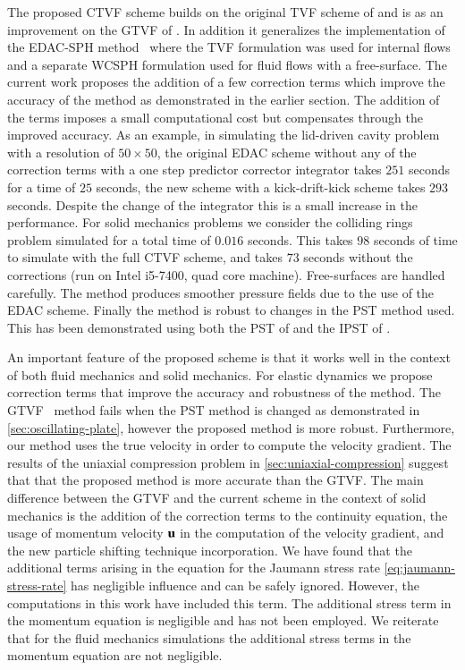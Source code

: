 The proposed CTVF scheme builds on the original TVF scheme of
\cite{Adami2013} and is as an improvement on the GTVF of
\cite{zhang_hu_adams17}. In addition it generalizes the implementation of the
EDAC-SPH method~\citep{edac-sph:cf:2019} where the TVF formulation was used for
internal flows and a separate WCSPH formulation used for fluid flows with a
free-surface. The current work proposes the addition of a few correction terms
which improve the accuracy of the method as demonstrated in the earlier
section. The addition of the terms imposes a small computational cost but
compensates through the improved accuracy. As an example, in simulating the
lid-driven cavity problem with a resolution of $50 \times 50$, the original
EDAC scheme without any of the correction terms with a one step predictor
corrector integrator takes $251$ seconds for a time of $25$ seconds, the new
scheme with a kick-drift-kick scheme takes $293$ seconds. Despite the change
of the integrator this is a small increase in the performance. For solid
mechanics problems we consider the colliding rings problem simulated for a
total time of $0.016$ seconds. This takes $98$ seconds of time to simulate
with the full CTVF scheme, and takes $73$ seconds without the corrections (run
on Intel i5-7400, quad core machine). Free-surfaces are handled carefully.
The method produces smoother pressure fields due to the use of the EDAC
scheme. Finally the method is robust to changes in the PST method used. This
has been demonstrated using both the PST of \cite{sun_consistent_2019} and
the IPST of \cite{huang_kernel_2019}.

An important feature of the proposed scheme is that it works well in the
context of both fluid mechanics and solid mechanics. For elastic dynamics we
propose correction terms that improve the accuracy and robustness of the
method. The GTVF~\citep{zhang_hu_adams17} method fails when the PST method is
changed as demonstrated in \cref{sec:oscillating-plate}, however the proposed
method is more robust. Furthermore, our method uses the true velocity in order
to compute the velocity gradient. The results of the uniaxial compression
problem in \cref{sec:uniaxial-compression} suggest that that the proposed
method is more accurate than the GTVF. The main difference between the GTVF
and the current scheme in the context of solid mechanics is the addition of
the correction terms to the continuity equation, the usage of momentum
velocity $\mathbf{u}$ in the computation of the velocity gradient, and the new
particle shifting technique incorporation. We have found that the additional
terms arising in the equation for the Jaumann stress rate
\cref{eq:jaumann-stress-rate} has negligible influence and can be safely
ignored. However, the computations in this work have included this term. The
additional stress term in the momentum equation is negligible and has not been
employed. We reiterate that for the fluid mechanics simulations the additional
stress terms in the momentum equation are not negligible.


